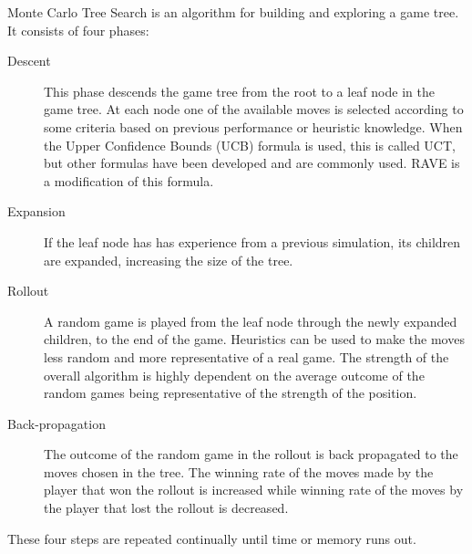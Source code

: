 Monte Carlo Tree Search is an algorithm for building and exploring a game tree. It consists of four phases:
\begin{description}
\item[Descent] This phase descends the game tree from the root to a leaf node in the game tree. At each node one of the available moves is selected according to some criteria based on previous performance or heuristic knowledge. When the Upper Confidence Bounds (UCB) formula is used, this is called UCT, but other formulas have been developed and are commonly used. RAVE is a modification of this formula.
\item[Expansion] If the leaf node has has experience from a previous simulation, its children are expanded, increasing the size of the tree.
\item[Rollout] A random game is played from the leaf node through the newly expanded children, to the end of the game. Heuristics can be used to make the moves less random and more representative of a real game. The strength of the overall algorithm is highly dependent on the average outcome of the random games being representative of the strength of the position.
\item[Back-propagation] The outcome of the random game in the rollout is back propagated to the moves chosen in the tree. The winning rate of the moves made by the player that won the rollout is increased while winning rate of the moves by the player that lost the rollout is decreased.
\end{description}

These four steps are repeated continually until time or memory runs out.





